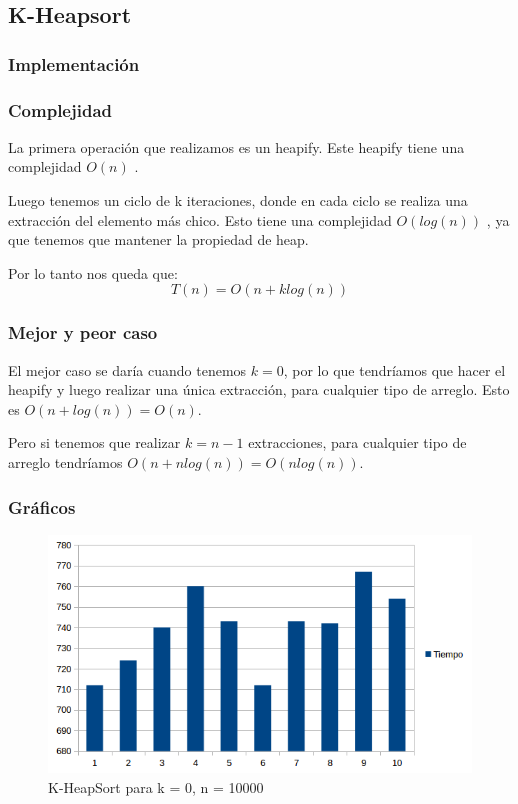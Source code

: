 \newpage
\subsection{K-Heapsort}

\subsubsection{Implementación}

\subsubsection{Complejidad}
La primera operación que realizamos es un heapify. Este heapify tiene una complejidad $O(n)$ \cite{STD_MAKEHEAP}.

Luego tenemos un ciclo de k iteraciones, donde en cada ciclo se realiza una extracción del elemento más chico. Esto tiene una complejidad $O(log(n))$ \cite{STD_POPHEAP}, ya que tenemos que mantener la propiedad de heap.

Por lo tanto nos queda que:
$$ T(n) = O(n + klog(n)) $$

\subsubsection{Mejor y peor caso}
El mejor caso se daría cuando tenemos $k = 0$, por lo que tendríamos que hacer el heapify y luego realizar una única extracción, para cualquier tipo de arreglo. Esto es $O(n + log(n)) = O(n)$.

Pero si tenemos que realizar $k = n-1$ extracciones, para cualquier tipo de arreglo tendríamos $O(n + nlog(n)) = O(nlog(n)) $.

\subsubsection{Gráficos}
\begin{figure}[H]
\centering
\includegraphics[width=\textwidth]{KZero/KHeapSortK0_Png.png}
\caption{K-HeapSort para k = 0, n = 10000}
\end{figure}

